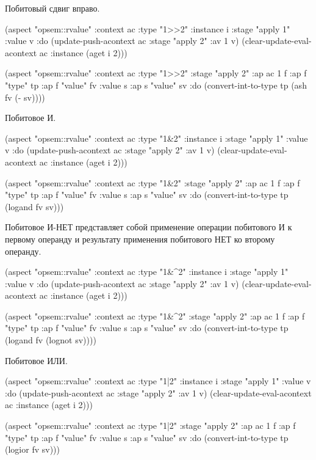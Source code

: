\documentclass[12pt,twoside,russian]{article}
\begin{document}
Побитовый сдвиг вправо.

\begin{ABMLCode}
(aspect "opsem::rvalue" :context ac :type "1>>2" :instance i 
  :stage "apply 1" :value v :do 
  (update-push-acontext ac :stage "apply 2" :av 1 v)
  (clear-update-eval-acontext ac :instance (aget i 2)))

(aspect "opsem::rvalue" :context ac :type "1>>2" :stage "apply 2" 
  :ap ac 1 f :ap f "type" tp :ap f "value" fv :value s 
  :ap s "value" sv :do 
  (convert-int-to-type tp (ash fv (- sv))))
\end{ABMLCode}

Побитовое И.

\begin{ABMLCode}
(aspect "opsem::rvalue" :context ac :type "1&2" :instance i 
  :stage "apply 1" :value v :do 
  (update-push-acontext ac :stage "apply 2" :av 1 v)
  (clear-update-eval-acontext ac :instance (aget i 2)))

(aspect "opsem::rvalue" :context ac :type "1&2" :stage "apply 2" 
  :ap ac 1 f :ap f "type" tp :ap f "value" fv :value s 
  :ap s "value" sv :do 
  (convert-int-to-type tp (logand fv sv)))
\end{ABMLCode}

Побитовое И-НЕТ представляет собой применение операции побитового И к первому операнду и результату применения побитового НЕТ ко второму операнду.

\begin{ABMLCode}
(aspect "opsem::rvalue" :context ac :type "1&^2" :instance i 
  :stage "apply 1" :value v :do 
  (update-push-acontext ac :stage "apply 2" :av 1 v)
  (clear-update-eval-acontext ac :instance (aget i 2)))
    
(aspect "opsem::rvalue" :context ac :type "1&^2" :stage "apply 2" 
  :ap ac 1 f :ap f "type" tp :ap f "value" fv :value s 
  :ap s "value" sv :do 
  (convert-int-to-type tp (logand fv (lognot sv))))
\end{ABMLCode}

Побитовое ИЛИ.

\begin{ABMLCode}
(aspect "opsem::rvalue" :context ac :type "1|2" :instance i 
  :stage "apply 1" :value v :do 
  (update-push-acontext ac :stage "apply 2" :av 1 v)
  (clear-update-eval-acontext ac :instance (aget i 2)))
  
(aspect "opsem::rvalue" :context ac :type "1|2" :stage "apply 2" 
  :ap ac 1 f :ap f "type" tp :ap f "value" fv :value s 
  :ap s "value" sv :do 
  (convert-int-to-type tp (logior fv sv)))
\end{ABMLCode}
\end{document}
